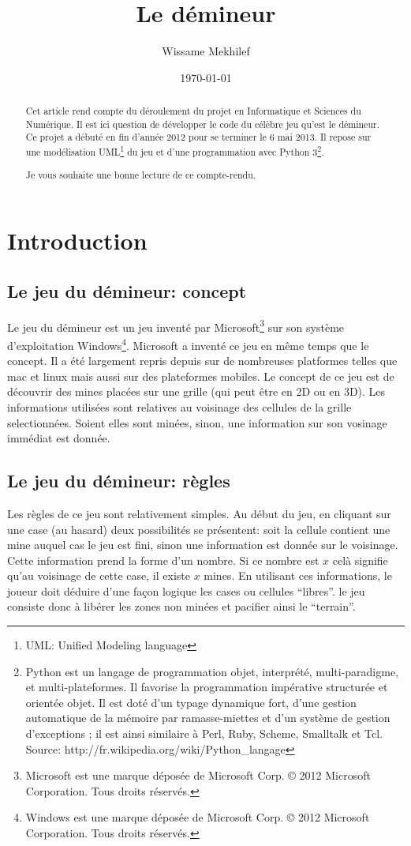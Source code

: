 \documentclass[a4paper,11pt]{article}
\title{Le démineur}
\author{Wissame Mekhilef\date{\today}}
\newcommand{\ml}[0]{\par\noindent}
\begin{document}
\maketitle

\begin{abstract}
Cet article rend compte du déroulement du projet en Informatique et Sciences du
Numérique. Il est ici question de développer
le code du célèbre jeu qu'est le démineur. Ce projet a débuté en fin d'année
2012 pour se terminer le 6 mai 2013. Il repose sur une modélisation
UML\footnote{UML: Unified Modeling language} du jeu et d'une programmation avec
Python 3\footnote{Python est un langage de programmation objet, interprété,
multi-paradigme, et multi-plateformes. Il favorise la programmation impérative
structurée et orientée objet. Il est doté d'un typage dynamique fort, d'une
gestion automatique de la mémoire par ramasse-miettes et d'un système de gestion
d'exceptions ; il est ainsi similaire à Perl, Ruby, Scheme, Smalltalk et
Tcl. Source: http://fr.wikipedia.org/wiki/Python\_langage}. 
\ml
Je vous souhaite une bonne lecture de ce compte-rendu. 
\end{abstract}

\newpage

\section{Introduction}

\subsection{Le jeu du démineur: concept}
Le jeu du démineur est un jeu inventé par Microsoft\footnote{Microsoft est une marque déposée de Microsoft Corp. © 2012 Microsoft Corporation. Tous droits réservés.} 
sur son système d'exploitation Windows\footnote{Windows est une marque déposée de Microsoft Corp. © 2012 Microsoft Corporation. Tous droits réservés.}. Microsoft a inventé
ce jeu en même temps que le concept. Il a été largement repris depuis sur de nombreuses platformes telles que mac et linux mais aussi sur des plateformes mobiles.
Le concept de ce jeu est de découvrir des mines placées sur une grille (qui peut être en 2D ou en 3D). Les informations utilisées sont relatives au voisinage des cellules de la grille selectionnées. Soient elles sont minées, sinon, une information sur son vosinage immédiat est donnée.

\subsection{Le jeu du démineur: règles}
Les règles de ce jeu sont relativement simples. Au début du jeu, en cliquant sur
une case (au hasard) deux possibilités se présentent:
soit la cellule contient une mine auquel cas le jeu est fini, sinon une
information est donnée sur le voisinage. Cette information prend la forme d'un
nombre. Si ce nombre est $x$ celà signifie qu'au voisinage de cette case, il
existe $x$ mines. En utilisant ces informations, le joueur doit déduire d'une façon logique les cases ou cellules ``libres''.
le jeu consiste donc à libérer les zones non minées et pacifier ainsi le ``terrain''.
\end{document}
